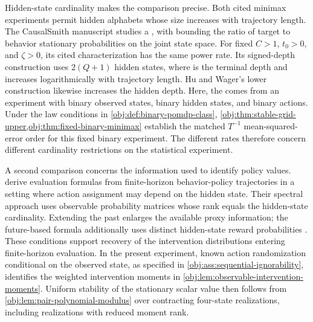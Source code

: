 \documentclass[11pt]{article}
\begin{document}
Hidden-state cardinality makes the comparison precise. Both cited minimax experiments permit hidden alphabets whose size increases with trajectory length. The CausalSmith manuscript studies a , with  bounding the ratio of target to behavior stationary probabilities on the joint state space. For fixed \(C>1\), \(t_0>0\), and \(\zeta>0\), its cited characterization has the same power rate. Its signed-depth construction uses \(2(Q+1)\) hidden states, where  is the terminal depth and increases logarithmically with trajectory length. Hu and Wager's lower construction likewise increases the hidden depth. Here, the  comes from an experiment with binary observed states, binary hidden states, and binary actions. Under the law conditions in \cref{obj:def:binary-pomdp-class}, \cref{obj:thm:stable-grid-upper,obj:thm:fixed-binary-minimax} establish the matched \(T^{-1}\) mean-squared-error order for this fixed binary experiment. The different rates therefore concern different cardinality restrictions on the statistical experiment.

A second comparison concerns the information used to identify policy values. \citet[Section 4, Assumptions 2--4, and Theorems 2--4]{NairJiang2021} derive evaluation formulas from finite-horizon behavior-policy trajectories in a setting where action assignment may depend on the hidden state. Their spectral approach uses observable probability matrices whose rank equals the hidden-state cardinality. Extending the past enlarges the available proxy information; the future-based formula additionally uses distinct hidden-state reward probabilities \citep[Assumption 5 and Theorem 4]{NairJiang2021}. These conditions support recovery of the intervention distributions entering finite-horizon evaluation. In the present experiment, known action randomization conditional on the observed state, as specified in \cref{obj:ass:sequential-ignorability}, identifies the weighted intervention moments in \cref{obj:lem:observable-intervention-moments}. Uniform stability of the stationary scalar value then follows from \cref{obj:lem:pair-polynomial-modulus} over contracting four-state realizations, including realizations with reduced moment rank.
\end{document}
